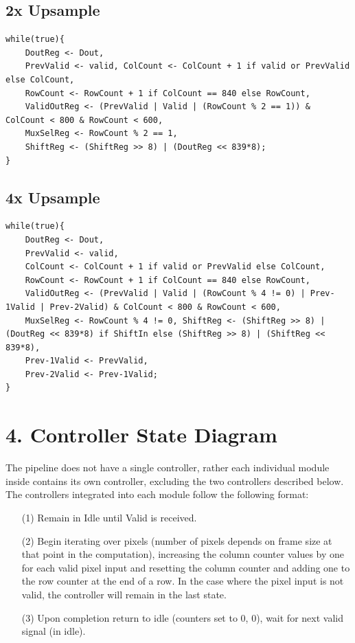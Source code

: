 \documentclass[11pt]{article}
\begin{document}
\subsection*{2x Upsample}
\begin{lstlisting}
while(true){
    DoutReg <- Dout, 
    PrevValid <- valid, ColCount <- ColCount + 1 if valid or PrevValid else ColCount, 
    RowCount <- RowCount + 1 if ColCount == 840 else RowCount, 
    ValidOutReg <- (PrevValid | Valid | (RowCount % 2 == 1)) & ColCount < 800 & RowCount < 600, 
    MuxSelReg <- RowCount % 2 == 1, 
    ShiftReg <- (ShiftReg >> 8) | (DoutReg << 839*8);
}
\end{lstlisting}

\subsection*{4x Upsample}
\begin{lstlisting}
while(true){
    DoutReg <- Dout, 
    PrevValid <- valid, 
    ColCount <- ColCount + 1 if valid or PrevValid else ColCount, 
    RowCount <- RowCount + 1 if ColCount == 840 else RowCount, 
    ValidOutReg <- (PrevValid | Valid | (RowCount % 4 != 0) | Prev-1Valid | Prev-2Valid) & ColCount < 800 & RowCount < 600, 
    MuxSelReg <- RowCount % 4 != 0, ShiftReg <- (ShiftReg >> 8) | (DoutReg << 839*8) if ShiftIn else (ShiftReg >> 8) | (ShiftReg << 839*8), 
    Prev-1Valid <- PrevValid, 
    Prev-2Valid <- Prev-1Valid;
}
\end{lstlisting}


\section*{4. Controller State Diagram}

The pipeline does not have a single controller, rather each individual module
inside contains its own controller, excluding the two controllers described below. 
The controllers integrated into each module follow the following format:

\begin{itemize}
    \item[(1)] Remain in Idle until Valid is received.
    \item[(2)] Begin iterating over pixels (number of pixels depends on frame size at that point in the computation), increasing the column counter values
        by one for each valid pixel input and resetting the column counter and adding
        one to the row counter at the end of a row. In the case where the pixel
        input is not valid, the controller will remain in the last state.
    \item[(3)] Upon completion return to idle (counters set to 0, 0), wait for next valid signal (in idle).
\end{itemize}
\end{document}
